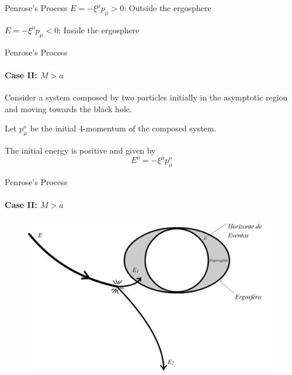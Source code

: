 \documentclass{beamer}
\begin{document}
\begin{darkframes}
\begin{frame}{Penrose's Process}
           $E=-\xi^{\mu}p_{\mu}>0$: Outside the ergosphere\\
           \bigskip
           \pause
           
           $E=-\xi^{\mu}p_{\mu}<0$: Inside the ergosphere
        \end{frame}
        
         \begin{frame}{Penrose's Process}
       	\framesubtitle{Case II: $M>a$}
           Consider a system composed by two particles initially in the asymptotic region and moving towards the
black hole.\\
\pause
\bigskip

Let $p_{\mu}^{o}$ be the initial 4-momentum of the composed
system.\\
\pause
\bigskip

The initial energy is positive and given by
$$E^{o}=-\xi^{\mu}p_{\mu}^{o}$$
        \end{frame}
        
        \end{darkframes}
    
        \begin{frame}{Penrose's Process}
         \framesubtitle{Case II: $M>a$}
        	\begin{center}
				\begin{figure}
				\includegraphics[scale=0.75] {figures/fig41.jpg}
				\end{figure}
			\end{center}	
        \end{frame}
  
\end{document}
